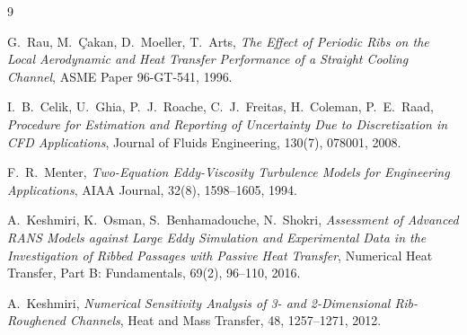 \documentclass[11pt,a4paper]{article}
\begin{document}
\begin{thebibliography}{9}

G.~Rau, M.~\c{C}akan, D.~Moeller, T.~Arts,
\emph{The Effect of Periodic Ribs on the Local Aerodynamic and Heat
Transfer Performance of a Straight Cooling Channel},
ASME Paper 96-GT-541, 1996.

I.~B.~Celik, U.~Ghia, P.~J.~Roache, C.~J.~Freitas, H.~Coleman, P.~E.~Raad,
\emph{Procedure for Estimation and Reporting of Uncertainty Due to
Discretization in CFD Applications},
Journal of Fluids Engineering, 130(7), 078001, 2008.

F.~R.~Menter,
\emph{Two-Equation Eddy-Viscosity Turbulence Models for Engineering
Applications},
AIAA Journal, 32(8), 1598--1605, 1994.

A.~Keshmiri, K.~Osman, S.~Benhamadouche, N.~Shokri,
\emph{Assessment of Advanced RANS Models against Large Eddy Simulation and
Experimental Data in the Investigation of Ribbed Passages with Passive Heat
Transfer},
Numerical Heat Transfer, Part B: Fundamentals, 69(2), 96--110, 2016.

A.~Keshmiri,
\emph{Numerical Sensitivity Analysis of 3- and 2-Dimensional Rib-Roughened
Channels},
Heat and Mass Transfer, 48, 1257--1271, 2012.

\end{thebibliography}
\end{document}
